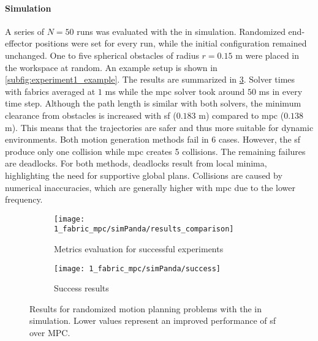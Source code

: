 \paragraph{Simulation}
A series of $N=50$ runs was evaluated with the \panda{} in simulation. Randomized
end-effector positions were set for every run, while the initial configuration
remained unchanged. One to five spherical obstacles of
radius $r=0.15$ m were
placed in the workspace at random. An example setup is shown in
\cref{subfig:experiment1_example}. The results are summarized in 
\cref{fig:experiment1_simPanda}. Solver times with fabrics averaged at $1$ ms while the
\ac{mpc} solver took around $50$ ms in every time step. Although the path length is similar
with both solvers, the minimum clearance from obstacles is increased with \ac{sf}
($0.183$ m) compared to \ac{mpc} ($0.138$ m). This means that the trajectories are
safer and thus more suitable for dynamic environments.
Both motion generation methods fail in 6 cases. However, the \ac{sf} produce only
one collision while \ac{mpc} creates 5 collisions. The remaining failures are deadlocks.
For both methods, deadlocks result from local minima, highlighting the 
need for supportive global plans. Collisions are caused
by numerical inaccuracies, which are generally higher with \ac{mpc} due
to the lower frequency.

\begin{figure}[ht]
  \centering
  \begin{subfigure}{1.0\linewidth}
    \centering
    \texttt{[image: 1\_fabric\_mpc/simPanda/results\_comparison]}
    \caption{Metrics evaluation for successful experiments}%
    \label{subfig:experiment1_simPanda_res}
  \end{subfigure}
  \begin{subfigure}{1.0\linewidth}
    \centering
    \texttt{[image: 1\_fabric\_mpc/simPanda/success]}
    \caption{Success results}%
    \label{subfig:experiment1_simPanda_success}
  \end{subfigure}
  \caption{Results for randomized motion planning problems with the \panda{} in simulation.
    Lower values represent an improved performance of \ac{sf} over MPC.
  }%
  \label{fig:experiment1_simPanda}
\end{figure}

